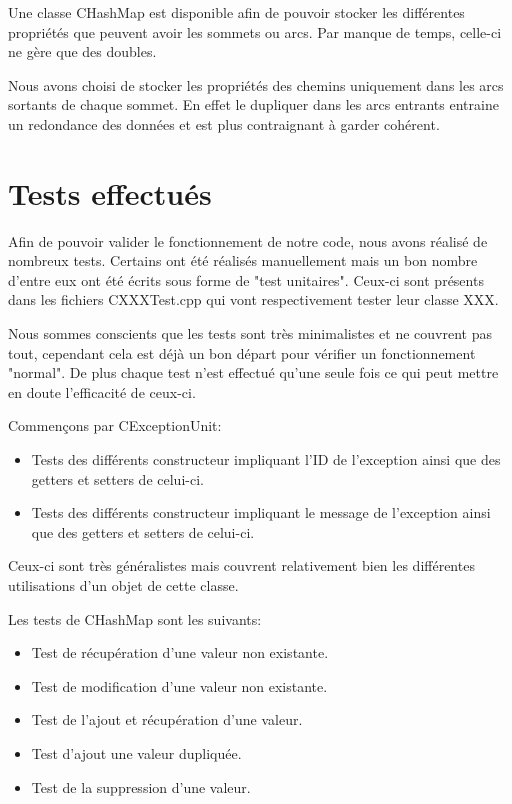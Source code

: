 		Une classe CHashMap est disponible afin de pouvoir stocker les différentes propriétés que peuvent avoir les sommets ou arcs. Par manque de temps, celle-ci ne gère que des doubles.
		
		Nous avons choisi de stocker les propriétés des chemins uniquement dans les arcs sortants de chaque sommet. En effet le dupliquer dans les arcs entrants entraine un redondance des données et est plus contraignant à garder cohérent.
	\chapter{Tests effectués}
		Afin de pouvoir valider le fonctionnement de notre code, nous avons réalisé de nombreux tests. Certains ont été réalisés manuellement mais un bon nombre d'entre eux ont été écrits sous forme de "test unitaires". Ceux-ci sont présents dans les fichiers CXXXTest.cpp qui vont respectivement tester leur classe XXX.
		
		Nous sommes conscients que les tests sont très minimalistes et ne couvrent pas tout, cependant cela est déjà un bon départ pour vérifier un fonctionnement "normal". De plus chaque test n'est effectué qu'une seule fois ce qui peut mettre en doute l'efficacité de ceux-ci.
		
		Commençons par CExceptionUnit:
		\begin{itemize}
			\item Tests des différents constructeur impliquant l'ID de l'exception ainsi que des getters et setters de celui-ci.
			\item Tests des différents constructeur impliquant le message de l'exception ainsi que des getters et setters de celui-ci.\\
		\end{itemize}
		Ceux-ci sont très généralistes mais couvrent relativement bien les différentes utilisations d'un objet de cette classe.
		
		Les tests de CHashMap sont les suivants:
		\begin{itemize}
			\item Test de récupération d'une valeur non existante.
			\item Test de modification d'une valeur non existante.
			\item Test de l'ajout et récupération d'une valeur.
			\item Test d'ajout une valeur dupliquée.
			\item Test de la suppression d'une valeur.
		\end{itemize}
		
